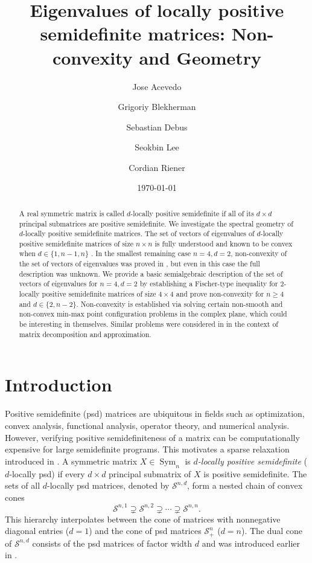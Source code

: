 \documentclass[reqno,hidelinks,11pt]{amsart}
\title{Eigenvalues of locally positive semidefinite matrices: Non-convexity and Geometry}
\author{Jose Acevedo}
\author{Grigoriy Blekherman}
\author{Sebastian Debus}
\author{Seokbin Lee}
\author{Cordian Riener}
\date{\today}
\numberwithin{equation}{section}
\def\S{\mathcal{S}}
\def\Sym{\operatorname{Sym}}
\begin{document}
\begin{abstract}
A real symmetric matrix is called $d$-locally positive semidefinite if all of its $d \times d$ principal submatrices are positive semidefinite. We investigate the spectral geometry of $d$-locally positive semidefinite matrices. The set of vectors of eigenvalues of $d$-locally positive semidefinite matrices of size $n \times n$ is fully understood and known to be convex when $d \in \{1,n-1,n\}$ \cite{blekherman2022hyperbolic}. In the smallest remaining case $n=4, d=2$, non-convexity of the set of vectors of eigenvalues was proved in \cite{kozhasov2023eigenvalues}, but even in this case the full description was unknown.
We provide a basic semialgebraic description of the set of vectors of eigenvalues for $n=4, d=2$ by establishing a Fischer-type inequality for $2$-locally positive semidefinite matrices of size $4 \times 4$ and prove non-convexity for $n \geq 4$ and $d \in \{2, n-2\}$. Non-convexity is established via solving certain non-smooth and non-convex min-max point configuration problems in the complex plane, which could be interesting in themselves.
Similar problems were considered in \cite{nesterenko2024submatrices,sengupta2026submatrices} in the context of matrix decomposition and approximation.
\end{abstract}
\maketitle



\section{Introduction}

Positive semidefinite (psd) matrices are ubiquitous in fields such as optimization, convex analysis, functional analysis, operator theory, and numerical analysis. However, verifying positive semidefiniteness of a matrix can be computationally expensive for large semidefinite programs.
This motivates a sparse relaxation introduced in \cite{blekherman2022sparse}. A symmetric matrix $X \in \Sym_n$ is \emph{$d$-locally positive semidefinite} ($d$-locally psd) if every $d \times d$ principal submatrix of $X$ is positive semidefinite.
The sets of all $d$-locally psd matrices, denoted by $\mathcal{S}^{n,d}$, form a nested chain of convex cones
\[
\mathcal{S}^{n,1} \supsetneq \mathcal{S}^{n,2} \supsetneq \cdots \supsetneq 
\mathcal{S}^{n,n}.
\]
This hierarchy interpolates between the cone of matrices with nonnegative diagonal entries ($d=1$) and the cone of psd matrices $\S^n_+$ ($d=n$). The dual cone of $\mathcal{S}^{n,d}$ consists of the psd matrices of factor width $d$ and was introduced earlier in \cite{boman2005factor}.
\end{document}
